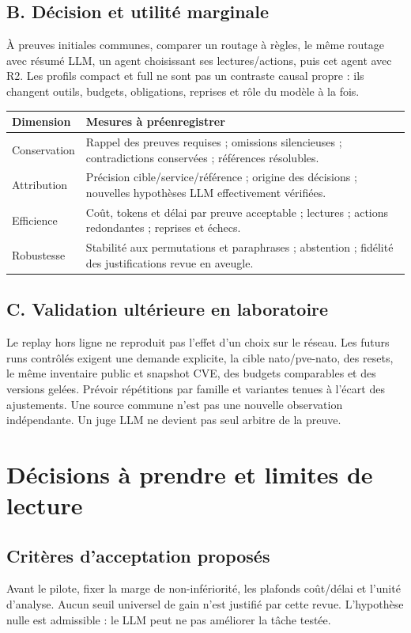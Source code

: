 \documentclass[11pt,a4paper]{article}
\begin{document}
\subsection{B. Décision et utilité marginale}
À preuves initiales communes, comparer un routage à règles, le même routage avec résumé LLM, un agent choisissant ses lectures/actions, puis cet agent avec R2. Les profils compact et full ne sont pas un contraste causal propre : ils changent outils, budgets, obligations, reprises et rôle du modèle à la fois.

\noindent\begin{tabularx}{\linewidth}{@{}>{\raggedright\arraybackslash}p{38mm}Y@{}}
\toprule
\textbf{Dimension} & \textbf{Mesures à préenregistrer} \\
\midrule
Conservation & Rappel des preuves requises ; omissions silencieuses ; contradictions conservées ; références résolubles. \\
Attribution & Précision cible/service/référence ; origine des décisions ; nouvelles hypothèses LLM effectivement vérifiées. \\
Efficience & Coût, tokens et délai par preuve acceptable ; lectures ; actions redondantes ; reprises et échecs. \\
Robustesse & Stabilité aux permutations et paraphrases ; abstention ; fidélité des justifications revue en aveugle. \\
\bottomrule
\end{tabularx}

\subsection{C. Validation ultérieure en laboratoire}
Le replay hors ligne ne reproduit pas l'effet d'un choix sur le réseau. Les futurs runs contrôlés exigent une demande explicite, la cible nato/pve-nato, des resets, le même inventaire public et snapshot CVE, des budgets comparables et des versions gelées. Prévoir répétitions par famille et variantes tenues à l'écart des ajustements. Une source commune n'est pas une nouvelle observation indépendante. Un juge LLM ne devient pas seul arbitre de la preuve.

\section{Décisions à prendre et limites de lecture}
\subsection{Critères d'acceptation proposés}
Avant le pilote, fixer la marge de non-infériorité, les plafonds coût/délai et l'unité d'analyse. Aucun seuil universel de gain n'est justifié par cette revue. L'hypothèse nulle est admissible : le LLM peut ne pas améliorer la tâche testée.
\end{document}
